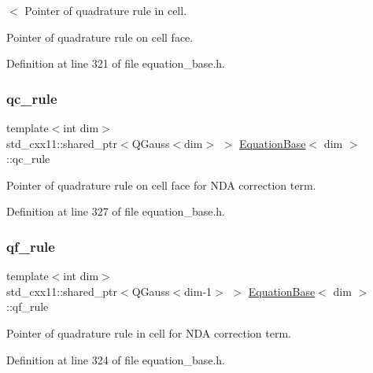 $<$ Pointer of quadrature rule in cell. 

Pointer of quadrature rule on cell face. 

Definition at line 321 of file equation\+\_\+base.\+h.

\mbox{\label{class_equation_base_a306b0c876f50b5eb936e5bf71ebcd988}} 
\subsubsection{\texorpdfstring{qc\+\_\+rule}{qc\_rule}}
{\footnotesize\ttfamily template$<$int dim$>$ \\
std\+\_\+cxx11\+::shared\+\_\+ptr$<$Q\+Gauss$<$dim$>$ $>$ \hyperlink{class_equation_base}{Equation\+Base}$<$ dim $>$\+::qc\+\_\+rule\hspace{0.3cm}{\ttfamily [protected]}}



Pointer of quadrature rule on cell face for N\+DA correction term. 



Definition at line 327 of file equation\+\_\+base.\+h.

\mbox{\label{class_equation_base_ab4c9256889d7f5a6b7d4295c81b9193b}} 
\subsubsection{\texorpdfstring{qf\+\_\+rule}{qf\_rule}}
{\footnotesize\ttfamily template$<$int dim$>$ \\
std\+\_\+cxx11\+::shared\+\_\+ptr$<$Q\+Gauss$<$dim-\/1$>$ $>$ \hyperlink{class_equation_base}{Equation\+Base}$<$ dim $>$\+::qf\+\_\+rule\hspace{0.3cm}{\ttfamily [protected]}}



Pointer of quadrature rule in cell for N\+DA correction term. 



Definition at line 324 of file equation\+\_\+base.\+h.

\mbox{\label{class_equation_base_a867f14c44c6132bd65542e9cdcf264c4}} 
